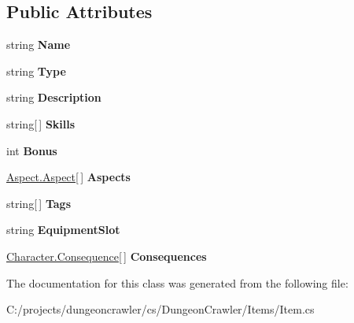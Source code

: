 \subsection*{Public Attributes}
\begin{DoxyCompactItemize}
\item 
\hypertarget{class_dungeon_crawler_1_1_items_1_1_item_a58588169a03fd5b7fb4ce9ec3e25cfa2}{}string {\bfseries Name}\label{class_dungeon_crawler_1_1_items_1_1_item_a58588169a03fd5b7fb4ce9ec3e25cfa2}

\item 
\hypertarget{class_dungeon_crawler_1_1_items_1_1_item_a129b97074cef2a2b64e23fd1fd9c003b}{}string {\bfseries Type}\label{class_dungeon_crawler_1_1_items_1_1_item_a129b97074cef2a2b64e23fd1fd9c003b}

\item 
\hypertarget{class_dungeon_crawler_1_1_items_1_1_item_ad5feecbbed50cda100c0bb479775521e}{}string {\bfseries Description}\label{class_dungeon_crawler_1_1_items_1_1_item_ad5feecbbed50cda100c0bb479775521e}

\item 
\hypertarget{class_dungeon_crawler_1_1_items_1_1_item_a32d18f402882e6dcd486260f75ce71ec}{}string\mbox{[}$\,$\mbox{]} {\bfseries Skills}\label{class_dungeon_crawler_1_1_items_1_1_item_a32d18f402882e6dcd486260f75ce71ec}

\item 
\hypertarget{class_dungeon_crawler_1_1_items_1_1_item_a6572ddbee66bb670aaec0381199be478}{}int {\bfseries Bonus}\label{class_dungeon_crawler_1_1_items_1_1_item_a6572ddbee66bb670aaec0381199be478}

\item 
\hypertarget{class_dungeon_crawler_1_1_items_1_1_item_a31db4277ca4b2e71e10a5476df8fea6d}{}\hyperlink{class_dungeon_crawler_1_1_aspect_1_1_aspect}{Aspect.\+Aspect}\mbox{[}$\,$\mbox{]} {\bfseries Aspects}\label{class_dungeon_crawler_1_1_items_1_1_item_a31db4277ca4b2e71e10a5476df8fea6d}

\item 
\hypertarget{class_dungeon_crawler_1_1_items_1_1_item_a421e3c7aba0a8c9ad861171d87f1fa93}{}string\mbox{[}$\,$\mbox{]} {\bfseries Tags}\label{class_dungeon_crawler_1_1_items_1_1_item_a421e3c7aba0a8c9ad861171d87f1fa93}

\item 
\hypertarget{class_dungeon_crawler_1_1_items_1_1_item_ac265a52fa70ab1f7b8f7300dd04d62e0}{}string {\bfseries Equipment\+Slot}\label{class_dungeon_crawler_1_1_items_1_1_item_ac265a52fa70ab1f7b8f7300dd04d62e0}

\item 
\hypertarget{class_dungeon_crawler_1_1_items_1_1_item_a7be11cc19706444d65d6dfb391f4adc9}{}\hyperlink{class_dungeon_crawler_1_1_character_1_1_consequence}{Character.\+Consequence}\mbox{[}$\,$\mbox{]} {\bfseries Consequences}\label{class_dungeon_crawler_1_1_items_1_1_item_a7be11cc19706444d65d6dfb391f4adc9}

\end{DoxyCompactItemize}


The documentation for this class was generated from the following file\+:\begin{DoxyCompactItemize}
\item 
C\+:/projects/dungeoncrawler/cs/\+Dungeon\+Crawler/\+Items/Item.\+cs\end{DoxyCompactItemize}
